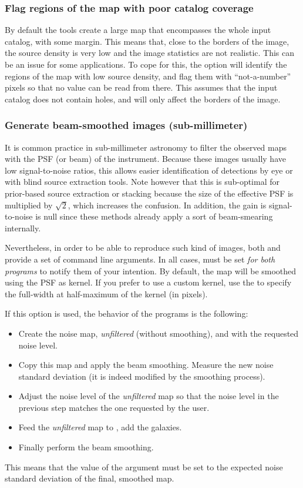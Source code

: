 \subsubsection{Flag regions of the map with poor catalog coverage}

By default the tools create a large map that encompasses the whole input catalog, with some margin. This means that, close to the borders of the image, the source density is very low and the image statistics are not realistic. This can be an issue for some applications. To cope for this, the  option  will identify the regions of the map with low source density, and flag them with ``not-a-number'' pixels so that no value can be read from there. This assumes that the input catalog does not contain holes, and will only affect the borders of the image.


\subsubsection{Generate beam-smoothed images (sub-millimeter)}

It is common practice in sub-millimeter astronomy to filter the observed maps with the PSF (or beam) of the instrument. Because these images usually have low signal-to-noise ratios, this allows easier identification of detections by eye or with blind source extraction tools. Note however that this is sub-optimal for prior-based source extraction or stacking because the size of the effective PSF is multiplied by $\sqrt{2}$, which increases the confusion. In addition, the gain is signal-to-noise is null since these methods already apply a sort of beam-smearing internally.

Nevertheless, in order to be able to reproduce such kind of images, both  and  provide a set of command line arguments. In all cases,  must be set \emph{for both programs} to notify them of your intention. By default, the map will be smoothed using the PSF as kernel. If you prefer to use a custom kernel, use the  to specify the full-width at half-maximum of the kernel (in pixels).

If this option is used, the behavior of the programs is the following:
\begin{itemize}
\item Create the noise map, \emph{unfiltered} (without smoothing), and with the requested noise level.
\item Copy this map and apply the beam smoothing. Measure the new noise standard deviation (it is indeed modified by the smoothing process).
\item Adjust the noise level of the \emph{unfiltered} map so that the noise level in the previous step matches the one requested by the user.
\item Feed the \emph{unfiltered} map to , add the galaxies.
\item Finally perform the beam smoothing.
\end{itemize}
This means that the value of the  argument must be set to the expected noise standard deviation of the final, smoothed map.

